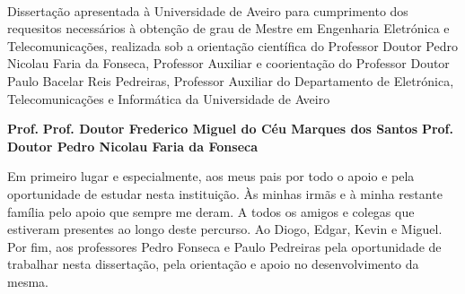 \TitlePage

  \HEADER{\BAR}
         {\ThesisYear}
  \TITLE{\myName}
        {\TituloTese}
        {\ThesisTitle}
\EndTitlePage
\titlepage\ \endtitlepage %


%
%

\TitlePage
  \HEADER{}{\ThesisYear}
  \TITLE{\myName}
        {\TituloTese}
        {\ThesisTitle}
  \vskip 15mm
  \TEXT{}
       {Dissertação apresentada à Universidade de Aveiro para cumprimento dos requesitos necessários à obtenção de grau de Mestre em Engenharia Eletrónica e Telecomunicações, realizada sob a orientação científica do Professor Doutor Pedro Nicolau Faria da Fonseca, Professor Auxiliar e coorientação do Professor Doutor Paulo Bacelar Reis Pedreiras, Professor Auxiliar do Departamento de Eletrónica, Telecomunicações e Informática da Universidade de Aveiro}
\EndTitlePage
\titlepage\ \endtitlepage %

\TitlePage
     \vspace*{55mm}
          {}
          {\textbf{Prof. 
          }}
     \vspace*{5mm}
          {\textbf{Prof. Doutor Frederico Miguel do Céu Marques dos Santos}}
     \vspace*{5mm}
     \TEXT{}
          {\textbf{Prof. Doutor Pedro Nicolau Faria da Fonseca}}
\EndTitlePage
\titlepage\ \endtitlepage %

\TitlePage
  \vspace*{55mm}
       {Em primeiro lugar e especialmente, aos meus pais por todo o apoio e pela oportunidade de estudar nesta instituição. Às minhas irmãs e à minha restante família pelo apoio que sempre me deram. \newline A todos os amigos e colegas que estiveram presentes ao longo deste percurso. \newline Ao Diogo, Edgar, Kevin e Miguel. \newline  Por fim, aos professores Pedro Fonseca e Paulo Pedreiras pela oportunidade de trabalhar nesta dissertação, pela orientação e apoio no desenvolvimento da mesma.}
\EndTitlePage
\titlepage\ \endtitlepage %


